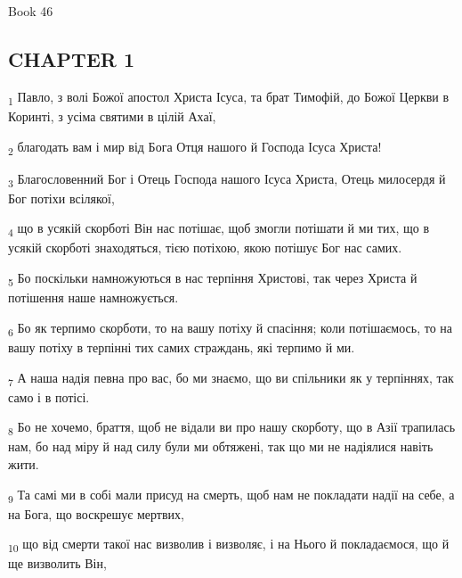 Book 46
\subsection{CHAPTER 1}
\begin{tcolorbox}
\textsubscript{1} Павло, з волі Божої апостол Христа Ісуса, та брат Тимофій, до Божої Церкви в Коринті, з усіма святими в цілій Ахаї,
\end{tcolorbox}
\begin{tcolorbox}
\textsubscript{2} благодать вам і мир від Бога Отця нашого й Господа Ісуса Христа!
\end{tcolorbox}
\begin{tcolorbox}
\textsubscript{3} Благословенний Бог і Отець Господа нашого Ісуса Христа, Отець милосердя й Бог потіхи всілякої,
\end{tcolorbox}
\begin{tcolorbox}
\textsubscript{4} що в усякій скорботі Він нас потішає, щоб змогли потішати й ми тих, що в усякій скорботі знаходяться, тією потіхою, якою потішує Бог нас самих.
\end{tcolorbox}
\begin{tcolorbox}
\textsubscript{5} Бо поскільки намножуються в нас терпіння Христові, так через Христа й потішення наше намножується.
\end{tcolorbox}
\begin{tcolorbox}
\textsubscript{6} Бо як терпимо скорботи, то на вашу потіху й спасіння; коли потішаємось, то на вашу потіху в терпінні тих самих страждань, які терпимо й ми.
\end{tcolorbox}
\begin{tcolorbox}
\textsubscript{7} А наша надія певна про вас, бо ми знаємо, що ви спільники як у терпіннях, так само і в потісі.
\end{tcolorbox}
\begin{tcolorbox}
\textsubscript{8} Бо не хочемо, браття, щоб не відали ви про нашу скорботу, що в Азії трапилась нам, бо над міру й над силу були ми обтяжені, так що ми не надіялися навіть жити.
\end{tcolorbox}
\begin{tcolorbox}
\textsubscript{9} Та самі ми в собі мали присуд на смерть, щоб нам не покладати надії на себе, а на Бога, що воскрешує мертвих,
\end{tcolorbox}
\begin{tcolorbox}
\textsubscript{10} що від смерти такої нас визволив і визволяє, і на Нього й покладаємося, що й ще визволить Він,
\end{tcolorbox}
